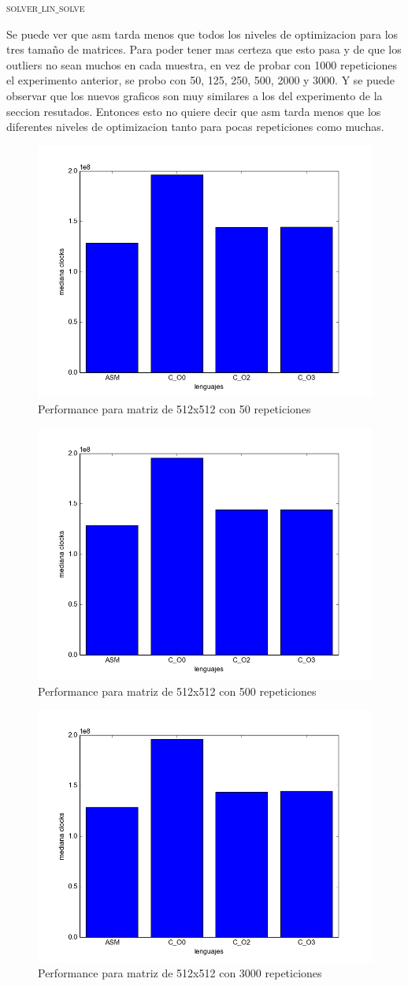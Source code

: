 {\scshape\Large solver$\_$lin$\_$solve\par}

Se puede ver que asm tarda menos que todos los niveles de optimizacion para los tres tamaño de matrices. Para poder tener mas certeza que esto pasa y de que los outliers no sean muchos en cada muestra, en vez de probar con 1000 repeticiones el experimento anterior, se probo con 50, 125, 250, 500, 2000 y 3000. Y se puede observar que los nuevos graficos son muy similares a los del experimento de la seccion resutados. Entonces esto no quiere decir que asm tarda menos que los diferentes niveles de optimizacion tanto para pocas repeticiones como muchas. 

\begin{figure}[h]
  \centering
  	\includegraphics[width=.6\linewidth]{Matriz_512_50.png}
  	\caption{Performance para matriz de 512x512 con 50 repeticiones}
  	\label{fig:M50it}
\end{figure}

\begin{figure}[h]
  \centering
  	\includegraphics[width=.6\linewidth]{Matriz_512_500.png}
  	\caption{Performance para matriz de 512x512 con 500 repeticiones}
  	\label{fig:M500it}
\end{figure}

\begin{figure}[h]
  \centering
  	\includegraphics[width=.6\linewidth]{Matriz_512_3000.png}
  	\caption{Performance para matriz de 512x512 con 3000 repeticiones}
  	\label{fig:M3000it}
\end{figure}
